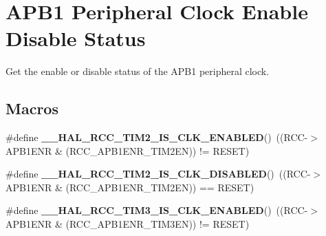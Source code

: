\hypertarget{group___r_c_c___a_p_b1___peripheral___clock___enable___disable___status}{}\section{A\+P\+B1 Peripheral Clock Enable Disable Status}
\label{group___r_c_c___a_p_b1___peripheral___clock___enable___disable___status}


Get the enable or disable status of the A\+P\+B1 peripheral clock.  


\subsection*{Macros}
\begin{DoxyCompactItemize}
\item 
\mbox{\label{group___r_c_c___a_p_b1___peripheral___clock___enable___disable___status_gadee5016adb1c8b62a5bb05f055859de0}} 
\#define {\bfseries \+\_\+\+\_\+\+H\+A\+L\+\_\+\+R\+C\+C\+\_\+\+T\+I\+M2\+\_\+\+I\+S\+\_\+\+C\+L\+K\+\_\+\+E\+N\+A\+B\+L\+ED}()~((R\+CC-\/$>$A\+P\+B1\+E\+NR \& (R\+C\+C\+\_\+\+A\+P\+B1\+E\+N\+R\+\_\+\+T\+I\+M2\+EN)) != R\+E\+S\+ET)
\item 
\mbox{\label{group___r_c_c___a_p_b1___peripheral___clock___enable___disable___status_gacaaa75c78c8ef4cf85f30fb20d522054}} 
\#define {\bfseries \+\_\+\+\_\+\+H\+A\+L\+\_\+\+R\+C\+C\+\_\+\+T\+I\+M2\+\_\+\+I\+S\+\_\+\+C\+L\+K\+\_\+\+D\+I\+S\+A\+B\+L\+ED}()~((R\+CC-\/$>$A\+P\+B1\+E\+NR \& (R\+C\+C\+\_\+\+A\+P\+B1\+E\+N\+R\+\_\+\+T\+I\+M2\+EN)) == R\+E\+S\+ET)
\item 
\mbox{\label{group___r_c_c___a_p_b1___peripheral___clock___enable___disable___status_gaf6090239db6a8a6917b3f3accea15ed0}} 
\#define {\bfseries \+\_\+\+\_\+\+H\+A\+L\+\_\+\+R\+C\+C\+\_\+\+T\+I\+M3\+\_\+\+I\+S\+\_\+\+C\+L\+K\+\_\+\+E\+N\+A\+B\+L\+ED}()~((R\+CC-\/$>$A\+P\+B1\+E\+NR \& (R\+C\+C\+\_\+\+A\+P\+B1\+E\+N\+R\+\_\+\+T\+I\+M3\+EN)) != R\+E\+S\+ET)
\item 
\mbox{\label{group___r_c_c___a_p_b1___peripheral___clock___enable___disable___status_ga50f8e043a42eaf534c1efa2477078c0a}} 

\end{DoxyCompactItemize}
